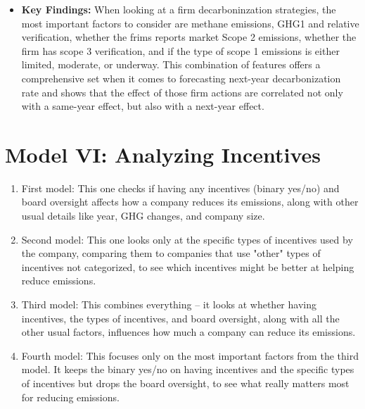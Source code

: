 \begin{itemize}
    \item \textbf{Key Findings:} When looking at a firm decarboninzation strategies, the most important factors to consider are methane emissions, GHG1 and relative verification, whether the frims reports market Scope 2 emissions, whether the firm has scope 3 verification, and if the type of scope 1 emissions is either limited, moderate, or underway. This combination of features offers a comprehensive set when it comes to forecasting next-year decarbonization rate and shows that the effect of those firm actions are correlated not only with a same-year effect, but also with a next-year effect.
    
    
\end{itemize}


\section{Model VI: Analyzing Incentives}

\begin{enumerate}
    \item First model: This one checks if having any incentives (binary yes/no) and board oversight affects how a company reduces its emissions, along with other usual details like year, GHG changes, and company size.
    \item Second model: This one looks only at the specific types of incentives used by the company, comparing them to companies that use "other" types of incentives not categorized, to see which incentives might be better at helping reduce emissions.
    \item Third model: This combines everything – it looks at whether having incentives, the types of incentives, and board oversight, along with all the other usual factors, influences how much a company can reduce its emissions.
    \item Fourth model: This focuses only on the most important factors from the third model. It keeps the binary yes/no on having incentives and the specific types of incentives but drops the board oversight, to see what really matters most for reducing emissions.
\end{enumerate}




